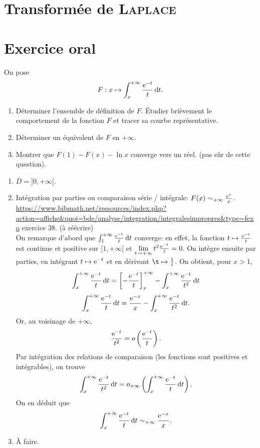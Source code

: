 \section{Transformée de \textsc{Laplace}} 
\label{transformee_laplace}



\section{Exercice oral}
\begin{exercice}
    On pose
    $$F:x \mapsto \int_x^{+\infty} \frac{\mathrm{e}^{-t}}{t} \, \mathrm{d} t.$$
    \begin{enumerate}
        \item Déterminer l'ensemble de définition de $F$. Étudier brièvement le comportement de la fonction $F$ et tracer sa courbe représentative.
        \item Déterminer un  équivalent de $F$ en $+\infty$.
        \item Montrer que $F(1) - F(x) - \ln x$ converge vers un réel. (pas sûr de cette question).
    \end{enumerate}
\end{exercice}

\begin{enumerate}
    \item $D = ]0, + \infty[$.
    \item Intégration par parties ou comparaison série / intégrale: $F(x) \sim_{+\infty} \frac{\mathrm{e}^{x}}{x}$. \\
    \url{https://www.bibmath.net/ressources/index.php?action=affiche&quoi=bde/analyse/integration/integralesimpropres&type=fexo} exercice 38. (à réécrire)\\
    On remarque d'abord que $\int_{1}^{+\infty} \frac{\mathrm{e}^{-t}}{t} \, \mathrm{d} t$ converge: en effet, la fonction $t \mapsto \frac{\mathrm{e}^{-t}}{t}$ est continue et positive sur $[1, + \infty[$ et $\lim\limits_{t \to +\infty} t^2 \frac{\mathrm{e}^{-t}}{t} = 0$. On intègre ensuite par parties, en intégrant $t \mapsto \mathrm{e}^{-t}$ et en dérivant $\t \mapsto \frac{1}{t}$. On obtient, pour $x > 1$, 
    $$\int_x^{+ \infty} \frac{\mathrm{e}^{-t}}{t} \, \mathrm{d} t = \left[ -\frac{\mathrm{e}^{-t}}{t} \right]_x^{+\infty} - \int_x^{+\infty} \frac{\mathrm{e}^{-t}}{t^2} \, \mathrm{d} t$$
    $$\int_x^{+ \infty} \frac{\mathrm{e}^{-t}}{t} \, \mathrm{d} t= \frac{\mathrm{e}^{-x}}{x} - \int_x^{+\infty} \frac{\mathrm{e}^{-t}}{t^2} \, \mathrm{d} t.$$
    Or, au voisinage de $+ \infty$, 
    $$\frac{\mathrm{e}^{-t}}{t^2} = o\left( \frac{\mathrm{e}^{-t}}{t} \right).$$
    Par intégration des relations de comparaison (les fonctions sont positives et intégrables), on trouve
    $$\int_x^{+\infty} \frac{\mathrm{e}^{-t}}{t^2} \, \mathrm{d} t = o_{+\infty} \left( \int_x^{+\infty} \frac{\mathrm{e}^{-t}}{t} \, \mathrm{d} t \right).$$
    On en déduit que
    $$\int_x^{+\infty} \frac{\mathrm{e}^{-t}}{t} \, \mathrm{d} t \sim_{+\infty} \frac{\mathrm{e}^{-x}}{x}.$$
    \item À faire.
\end{enumerate}

